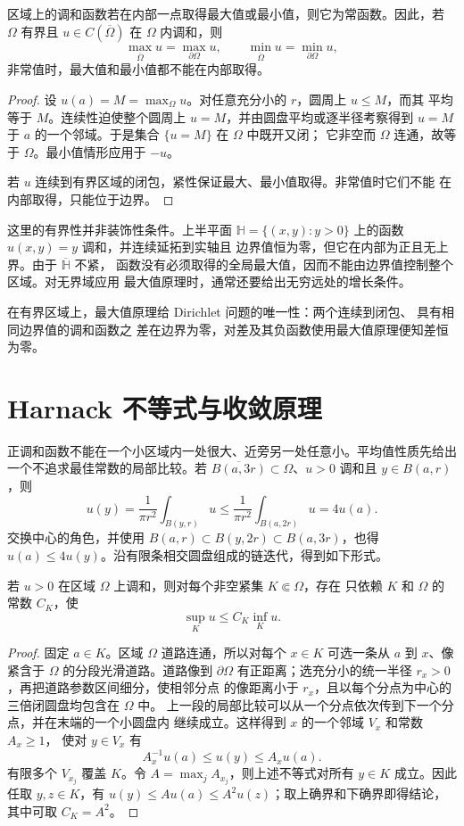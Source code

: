 \begin{theorem}[强最大值原理]\label{thm:harmonic-maximum-principle}
区域上的调和函数若在内部一点取得最大值或最小值，则它为常函数。因此，若
$\Omega$ 有界且 $u\in C(\overline\Omega)$ 在 $\Omega$ 内调和，则
\[
 \max_{\overline\Omega}u=\max_{\partial\Omega}u,
 \qquad
 \min_{\overline\Omega}u=\min_{\partial\Omega}u,
\]
非常值时，最大值和最小值都不能在内部取得。
\end{theorem}

\begin{proof}
设 $u(a)=M=\max_\Omega u$。对任意充分小的 $r$，圆周上 $u\le M$，而其
平均等于 $M$。连续性迫使整个圆周上 $u=M$，并由圆盘平均或逐半径考察得到
$u=M$ 于 $a$ 的一个邻域。于是集合 $\{u=M\}$ 在 $\Omega$ 中既开又闭；
它非空而 $\Omega$ 连通，故等于 $\Omega$。最小值情形应用于 $-u$。

若 $u$ 连续到有界区域的闭包，紧性保证最大、最小值取得。非常值时它们不能
在内部取得，只能位于边界。
\end{proof}

这里的有界性并非装饰性条件。上半平面
$\mathbb H=\{(x,y):y>0\}$ 上的函数 $u(x,y)=y$ 调和，并连续延拓到实轴且
边界值恒为零，但它在内部为正且无上界。由于 $\overline{\mathbb H}$ 不紧，
函数没有必须取得的全局最大值，因而不能由边界值控制整个区域。对无界域应用
最大值原理时，通常还要给出无穷远处的增长条件。

在有界区域上，最大值原理给 Dirichlet 问题的唯一性：两个连续到闭包、
具有相同边界值的调和函数之
差在边界为零，对差及其负函数使用最大值原理便知差恒为零。

\section{Harnack 不等式与收敛原理}

正调和函数不能在一个小区域内一处很大、近旁另一处任意小。平均值性质先给出
一个不追求最佳常数的局部比较。若
$\overline{B(a,3r)}\subset\Omega$、$u>0$ 调和且 $y\in B(a,r)$，则
\[
 u(y)=\frac1{\pi r^2}\int_{B(y,r)}u
 \le\frac1{\pi r^2}\int_{B(a,2r)}u=4u(a).
\]
交换中心的角色，并使用 $B(a,r)\subset B(y,2r)\subset B(a,3r)$，也得
$u(a)\le4u(y)$。沿有限条相交圆盘组成的链迭代，得到如下形式。

\begin{theorem}\label{thm:harnack-compact}
若 $u>0$ 在区域 $\Omega$ 上调和，则对每个非空紧集 $K\Subset\Omega$，存在
只依赖 $K$ 和 $\Omega$ 的常数 $C_K$，使
\[
 \sup_Ku\le C_K\inf_Ku.
\]
\end{theorem}

\begin{proof}
固定 $a\in K$。区域 $\Omega$ 道路连通，所以对每个 $x\in K$ 可选一条从
$a$ 到 $x$、像紧含于 $\Omega$ 的分段光滑道路。道路像到 $\partial\Omega$
有正距离；选充分小的统一半径 $r_x>0$，再把道路参数区间细分，使相邻分点
的像距离小于 $r_x$，且以每个分点为中心的三倍闭圆盘均包含在 $\Omega$ 中。
上一段的局部比较可以从一个分点依次传到下一个分点，并在末端的一个小圆盘内
继续成立。这样得到 $x$ 的一个邻域 $V_x$ 和常数 $A_x\ge1$，
使对 $y\in V_x$ 有
\[
 A_x^{-1}u(a)\le u(y)\le A_xu(a).
\]
有限多个 $V_{x_j}$ 覆盖 $K$。令 $A=\max_jA_{x_j}$，则上述不等式对所有
$y\in K$ 成立。因此任取 $y,z\in K$，有
$u(y)\le A u(a)\le A^2u(z)$；取上确界和下确界即得结论，其中可取
$C_K=A^2$。
\end{proof}

